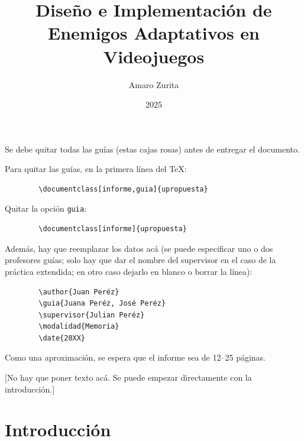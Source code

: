 \documentclass[informe]{upropuesta}
\title{Diseño e Implementación de Enemigos Adaptativos en Videojuegos}
\author{Amaro Zurita}
\date{2025}
\begin{document}
\maketitle

	\begin{pauta}
	Se debe quitar todas las guías (estas cajas rosas) antes de entregar el documento.
	
	Para quitar las guías, en la primera línea del \TeX: 
	
	\begin{verbatim}
		\documentclass[informe,guia]{upropuesta}
	\end{verbatim}
	
	Quitar la opción \texttt{guia}:
	
	\begin{verbatim}
		\documentclass[informe]{upropuesta}
	\end{verbatim}
	
	Además, hay que reemplazar los datos acá (se puede especificar uno o dos profesores guías; solo hay que dar el nombre del supervisor en el caso de la práctica extendida; en otro caso dejarlo en blanco o borrar la línea):
	
	\begin{verbatim}
		\author{Juan Peréz}
		\guia{Juana Peréz, José Peréz}
		\supervisor{Julian Peréz}
		\modalidad{Memoria}
		\date{20XX}
	\end{verbatim}
	
	Como una aproximación, se espera que el informe sea de 12--25 páginas.
	
	[No hay que poner texto acá. Se puede empezar directamente con la introducción.]
\end{pauta}

\section{Introducción}\label{sec:intro}
\end{document}
